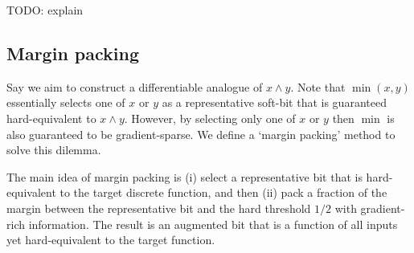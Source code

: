 \documentclass{article} %
\begin{document}
TODO: explain

\subsection{Margin packing}

Say we aim to construct a differentiable analogue of $x \wedge y$. Note that $\operatorname{min}(x,y)$ essentially selects one of $x$ or $y$ as a representative soft-bit that is guaranteed hard-equivalent to $x \wedge y$. However, by selecting only one of $x$ or $y$ then $\operatorname{min}$ is also guaranteed to be gradient-sparse. We define a `margin packing' method to solve this dilemma.

The main idea of margin packing is (i) select a representative bit that is hard-equivalent to the target discrete function, and then (ii) pack a fraction of the margin between the representative bit and the hard threshold $1/2$ with gradient-rich information. The result is an augmented bit that is a function of all inputs yet hard-equivalent to the target function.
\end{document}

